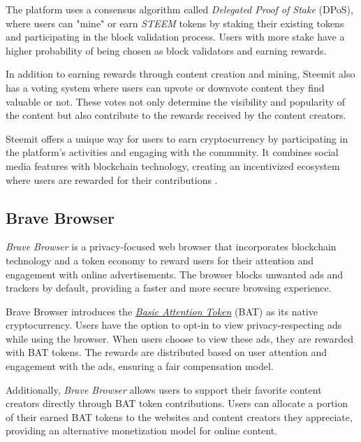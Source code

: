The platform uses a consensus algorithm called \textit{Delegated Proof of Stake} (DPoS), where users can "mine" or earn \textit{STEEM} tokens by staking their existing tokens and participating in the block validation process. Users with more stake have a higher probability of being chosen as block validators and earning rewards.\newline

In addition to earning rewards through content creation and mining, Steemit also has a voting system where users can upvote or downvote content they find valuable or not. These votes not only determine the visibility and popularity of the content but also contribute to the rewards received by the content creators.\newline

Steemit offers a unique way for users to earn cryptocurrency by participating in the platform's activities and engaging with the community. It combines social media features with blockchain technology, creating an incentivized ecosystem where users are rewarded for their contributions \cite{steemit}.\newline

\subsection{Brave Browser}

\textit{Brave Browser} is a privacy-focused web browser that incorporates blockchain technology and a token economy to reward users for their attention and engagement with online advertisements. The browser blocks unwanted ads and trackers by default, providing a faster and more secure browsing experience.\newline

Brave Browser introduces the \href{https://brave.com/brave-rewards/}{\textit{Basic Attention Token}} (BAT) as its native cryptocurrency. Users have the option to opt-in to view privacy-respecting ads while using the browser. When users choose to view these ads, they are rewarded with BAT tokens. The rewards are distributed based on user attention and engagement with the ads, ensuring a fair compensation model.\newline

Additionally, \textit{Brave Browser} allows users to support their favorite content creators directly through BAT token contributions. Users can allocate a portion of their earned BAT tokens to the websites and content creators they appreciate, providing an alternative monetization model for online content.\newline

